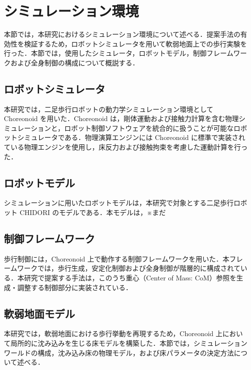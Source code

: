 \section{シミュレーション環境} \label{sec:simulation_environment}

本節では，本研究におけるシミュレーション環境について述べる．提案手法の有効性を検証するため，ロボットシミュレータを用いて軟弱地面上での歩行実験を行った．本節では，使用したシミュレータ，ロボットモデル，制御フレームワークおよび全身制御の構成について概説する．

\subsection{ロボットシミュレータ} \label{subsec:choreonoid}

本研究では，二足歩行ロボットの動力学シミュレーション環境として Choreonoid を用いた．Choreonoid は，剛体運動および接触力計算を含む物理シミュレーションと，ロボット制御ソフトウェアを統合的に扱うことが可能なロボットシミュレータである．物理演算エンジンには Choreonoid に標準で実装されている物理エンジンを使用し，床反力および接触拘束を考慮した運動計算を行った．

\subsection{ロボットモデル} \label{subsec:robot_model}

シミュレーションに用いたロボットモデルは，本研究で対象とする二足歩行ロボット CHIDORI のモデルである．本モデルは，※まだ

\subsection{制御フレームワーク} \label{subsec:control_framework}

歩行制御には，Choreonoid 上で動作する制御フレームワークを用いた．本フレームワークでは，歩行生成，安定化制御および全身制御が階層的に構成されている．本研究で提案する手法は，このうち重心（Center of Mass: CoM）参照を生成・調整する制御部分に実装されている．

\subsection{軟弱地面モデル}
\label{subsec:soft_ground_model}

本研究では，軟弱地面における歩行挙動を再現するため，Choreonoid 上において局所的に沈み込みを生じる床モデルを構築した．本節では，シミュレーションワールドの構成，沈み込み床の物理モデル，および床パラメータの決定方法について述べる．

